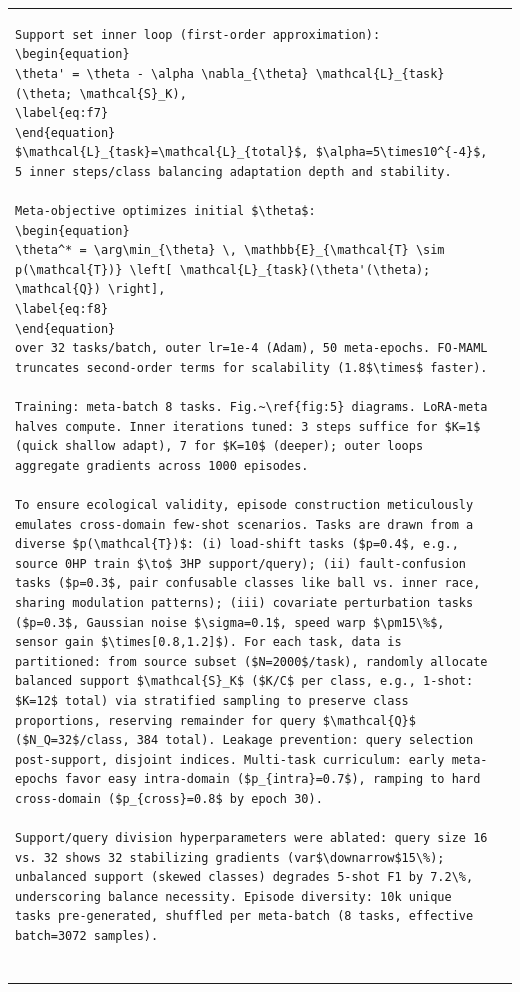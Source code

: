 \begin{table}[htbp]
\begin{tabular}{@{}ll@{}}
\begin{verbatim}
Support set inner loop (first-order approximation):
\begin{equation}
\theta' = \theta - \alpha \nabla_{\theta} \mathcal{L}_{task}(\theta; \mathcal{S}_K),
\label{eq:f7}
\end{equation}
$\mathcal{L}_{task}=\mathcal{L}_{total}$, $\alpha=5\times10^{-4}$, 5 inner steps/class balancing adaptation depth and stability.

Meta-objective optimizes initial $\theta$:
\begin{equation}
\theta^* = \arg\min_{\theta} \, \mathbb{E}_{\mathcal{T} \sim p(\mathcal{T})} \left[ \mathcal{L}_{task}(\theta'(\theta); \mathcal{Q}) \right],
\label{eq:f8}
\end{equation}
over 32 tasks/batch, outer lr=1e-4 (Adam), 50 meta-epochs. FO-MAML truncates second-order terms for scalability (1.8$\times$ faster).

Training: meta-batch 8 tasks. Fig.~\ref{fig:5} diagrams. LoRA-meta halves compute. Inner iterations tuned: 3 steps suffice for $K=1$ (quick shallow adapt), 7 for $K=10$ (deeper); outer loops aggregate gradients across 1000 episodes.

To ensure ecological validity, episode construction meticulously emulates cross-domain few-shot scenarios. Tasks are drawn from a diverse $p(\mathcal{T})$: (i) load-shift tasks ($p=0.4$, e.g., source 0HP train $\to$ 3HP support/query); (ii) fault-confusion tasks ($p=0.3$, pair confusable classes like ball vs. inner race, sharing modulation patterns); (iii) covariate perturbation tasks ($p=0.3$, Gaussian noise $\sigma=0.1$, speed warp $\pm15\%$, sensor gain $\times[0.8,1.2]$). For each task, data is partitioned: from source subset ($N=2000$/task), randomly allocate balanced support $\mathcal{S}_K$ ($K/C$ per class, e.g., 1-shot: $K=12$ total) via stratified sampling to preserve class proportions, reserving remainder for query $\mathcal{Q}$ ($N_Q=32$/class, 384 total). Leakage prevention: query selection post-support, disjoint indices. Multi-task curriculum: early meta-epochs favor easy intra-domain ($p_{intra}=0.7$), ramping to hard cross-domain ($p_{cross}=0.8$ by epoch 30).

Support/query division hyperparameters were ablated: query size 16 vs. 32 shows 32 stabilizing gradients (var$\downarrow$15\%); unbalanced support (skewed classes) degrades 5-shot F1 by 7.2\%, underscoring balance necessity. Episode diversity: 10k unique tasks pre-generated, shuffled per meta-batch (8 tasks, effective batch=3072 samples).


\end{verbatim}
\end{tabular}
\end{table}
